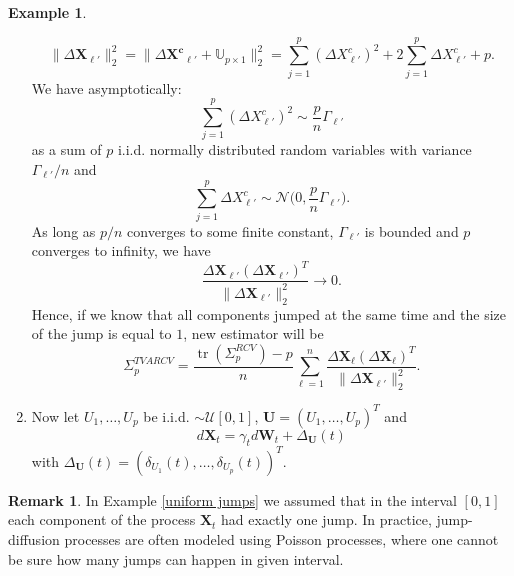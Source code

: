 \documentclass[a4paper,11pt]{article}
\theoremstyle{plain}
\theoremstyle{definition}
\newtheorem{exmp}[thm]{Example}
\newtheorem{rmrk}[thm]{Remark}
\newcommand{\tr}{\operatorname{tr}}
\begin{document}
\begin{exmp}
\begin{enumerate}
    	\[
    	\| \Delta \mathbf{X}_{\ell'} \|_2^2 = \| \Delta \mathbf{X^c}_{\ell'} + \mathbb{U}_{p \times 1} \|_2^2  = \sum_{j=1}^{p} (\Delta X^c_{\ell'})^2 + 2\sum_{j=1}^{p} \Delta X^c_{\ell'} + p.
    	\]
    	We have asymptotically:
    	\[
    	 \sum_{j=1}^{p} (\Delta X^c_{\ell'})^2 \sim \frac{p}{n}\Gamma_{\ell'}
    	 \]
    	 as a sum of $p$ i.i.d. normally distributed random variables with variance $\Gamma_{\ell'}/n$ and
    	 \[ \sum_{j=1}^{p} \Delta X^c_{\ell'} \sim \mathcal{N}\Big(0, \frac{p}{n}\Gamma_{\ell'}\Big). \]
    	 As long as $p/n$ converges to some finite constant, $\Gamma_{\ell'}$ is bounded and $p$ converges to infinity, we have
    	 \[ 
    	 \frac{\Delta \mathbf{X}_{\ell'}(\Delta \mathbf{X}_{\ell'})^T}{\| \Delta \mathbf{X}_{\ell'} \|_2^2} \rightarrow 0.
    	  \]
    	  Hence, if we know that all components jumped at the same time and the size of the jump is equal to $1$, new estimator will be
    	  \[ 
    	  \Sigma_p^{TVARCV} = \frac{\tr(\Sigma_p^{RCV}) - p}{n} \sum_{\ell=1}^{n} \frac{\Delta \mathbf{X}_{\ell}(\Delta \mathbf{X}_{\ell})^T}{\| \Delta \mathbf{X}_{\ell'} \|_2^2}.
    	   \]
   	
    	\item Now let $U_1, \dots, U_p$ be i.i.d. $\sim \mathcal{U}[0, 1]$, $\mathbf{U} = (U_1, \dots, U_p)^T$ and
    	\[ 
    	d\mathbf{X}_t = \gamma_t  d\mathbf{W}_t + \Delta_\mathbf{U}(t)
        \]
        with $\Delta_\mathbf{U}(t) = (\delta_{U_1}(t), \dots, \delta_{U_p}(t))^T$.
        \end{enumerate}
    \end{exmp}
    
    \begin{rmrk}
    	In Example \ref{uniform jumps} we assumed that in the interval $[0, 1]$ each component of the process $\mathbf{X}_t$ had exactly one jump. In practice, jump-diffusion processes are often modeled using Poisson processes, where one cannot be sure how many jumps can happen in given interval.
    \end{rmrk}
    
\end{document}
